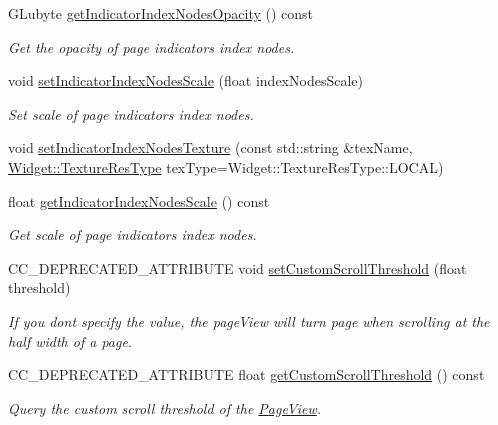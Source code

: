 \begin{DoxyCompactItemize}
G\+Lubyte \hyperlink{classui_1_1PageView_a230cf4bd9e8c587df41b4a0c7e7145f3}{get\+Indicator\+Index\+Nodes\+Opacity} () const
\begin{DoxyCompactList}\small\item\em Get the opacity of page indicator\textquotesingle{}s index nodes. \end{DoxyCompactList}\item 
void \hyperlink{classui_1_1PageView_a8660efb9530d9f8783b439e4ba0e2e63}{set\+Indicator\+Index\+Nodes\+Scale} (float index\+Nodes\+Scale)
\begin{DoxyCompactList}\small\item\em Set scale of page indicator\textquotesingle{}s index nodes. \end{DoxyCompactList}\item 
void \hyperlink{classui_1_1PageView_a1413a09228d8aa99d44afbd77b9354e4}{set\+Indicator\+Index\+Nodes\+Texture} (const std\+::string \&tex\+Name, \hyperlink{classui_1_1Widget_a040a65ec5ad3b11119b7e16b98bd9af0}{Widget\+::\+Texture\+Res\+Type} tex\+Type=Widget\+::\+Texture\+Res\+Type\+::\+L\+O\+C\+AL)
\item 
float \hyperlink{classui_1_1PageView_a651af56fb85c916b43daf98c54a3f863}{get\+Indicator\+Index\+Nodes\+Scale} () const
\begin{DoxyCompactList}\small\item\em Get scale of page indicator\textquotesingle{}s index nodes. \end{DoxyCompactList}\item 
C\+C\+\_\+\+D\+E\+P\+R\+E\+C\+A\+T\+E\+D\+\_\+\+A\+T\+T\+R\+I\+B\+U\+TE void \hyperlink{classui_1_1PageView_a4822a9ebfefc69a6d02a0bb13551523f}{set\+Custom\+Scroll\+Threshold} (float threshold)
\begin{DoxyCompactList}\small\item\em If you don\textquotesingle{}t specify the value, the page\+View will turn page when scrolling at the half width of a page. \end{DoxyCompactList}\item 
C\+C\+\_\+\+D\+E\+P\+R\+E\+C\+A\+T\+E\+D\+\_\+\+A\+T\+T\+R\+I\+B\+U\+TE float \hyperlink{classui_1_1PageView_a85a4d633a04862d0a2f4522beae37ae3}{get\+Custom\+Scroll\+Threshold} () const
\begin{DoxyCompactList}\small\item\em Query the custom scroll threshold of the \hyperlink{classui_1_1PageView}{Page\+View}. \end{DoxyCompactList}\item 

\end{DoxyCompactItemize}
